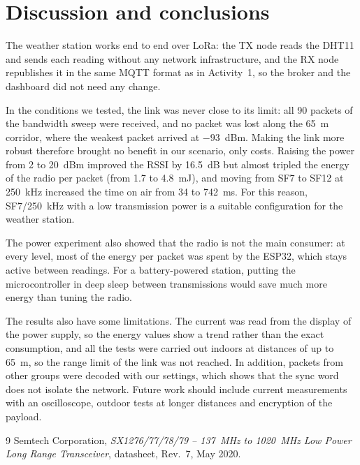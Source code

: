 \documentclass[informe,english]{plantilla}
\begin{document}
\section{Discussion and conclusions}
\label{sec:conclusions}

The weather station works end to end over LoRa: the TX node reads the DHT11 and sends each reading without any network infrastructure, and the RX node republishes it in the same MQTT format as in Activity~1, so the broker and the dashboard did not need any change.

In the conditions we tested, the link was never close to its limit: all 90 packets of the bandwidth sweep were received, and no packet was lost along the 65~m corridor, where the weakest packet arrived at $-93$~dBm. Making the link more robust therefore brought no benefit in our scenario, only costs. Raising the power from 2 to 20~dBm improved the RSSI by 16.5~dB but almost tripled the energy of the radio per packet (from 1.7 to 4.8~mJ), and moving from SF7 to SF12 at 250~kHz increased the time on air from 34 to 742~ms. For this reason, SF7/250~kHz with a low transmission power is a suitable configuration for the weather station.

The power experiment also showed that the radio is not the main consumer: at every level, most of the energy per packet was spent by the ESP32, which stays active between readings. For a battery-powered station, putting the microcontroller in deep sleep between transmissions would save much more energy than tuning the radio.

The results also have some limitations. The current was read from the display of the power supply, so the energy values show a trend rather than the exact consumption, and all the tests were carried out indoors at distances of up to 65~m, so the range limit of the link was not reached. In addition, packets from other groups were decoded with our settings, which shows that the sync word does not isolate the network. Future work should include current measurements with an oscilloscope, outdoor tests at longer distances and encryption of the payload.

\begin{thebibliography}{9}
     Semtech Corporation, \emph{SX1276/77/78/79 -- 137~MHz to 1020~MHz Low Power Long Range Transceiver}, datasheet, Rev.~7, May 2020.
\end{thebibliography}
\end{document}
